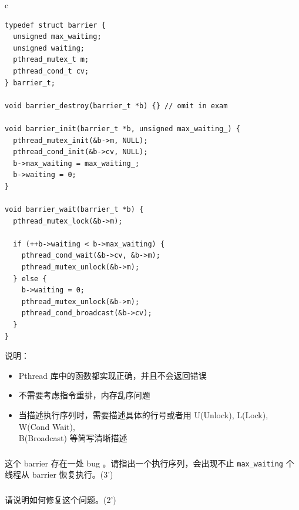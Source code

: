 \documentclass[a4paper,12pt]{article}
\newcommand{\score}[1]{(#1')}
\begin{document}
\begin{table}[htb]
  \centering
  \begin{tabular}{c}
    \begin{lstlisting}
typedef struct barrier {
  unsigned max_waiting;
  unsigned waiting;
  pthread_mutex_t m;
  pthread_cond_t cv;
} barrier_t;

void barrier_destroy(barrier_t *b) {} // omit in exam

void barrier_init(barrier_t *b, unsigned max_waiting_) {
  pthread_mutex_init(&b->m, NULL);
  pthread_cond_init(&b->cv, NULL);
  b->max_waiting = max_waiting_;
  b->waiting = 0;
}

void barrier_wait(barrier_t *b) {
  pthread_mutex_lock(&b->m);

  if (++b->waiting < b->max_waiting) {
    pthread_cond_wait(&b->cv, &b->m);
    pthread_mutex_unlock(&b->m);
  } else {
    b->waiting = 0;
    pthread_mutex_unlock(&b->m);
    pthread_cond_broadcast(&b->cv);
  }
}
    \end{lstlisting}
  \end{tabular}
\end{table}



说明：

\begin{itemize}
  \item Pthread 库中的函数都实现正确，并且不会返回错误
  \item 不需要考虑指令重排，内存乱序问题
  \item 当描述执行序列时，需要描述具体的行号或者用 U(Unlock), L(Lock), W(Cond Wait), \\
        B(Broadcast) 等简写清晰描述
\end{itemize}


\subsubsection{}

这个 barrier 存在一处 bug 。请指出一个执行序列，会出现不止 \verb|max_waiting| 个线程从 barrier 恢复执行。\score{3}

\subsubsection{}

请说明如何修复这个问题。\score{2}

\subsubsection{}
\end{document}
